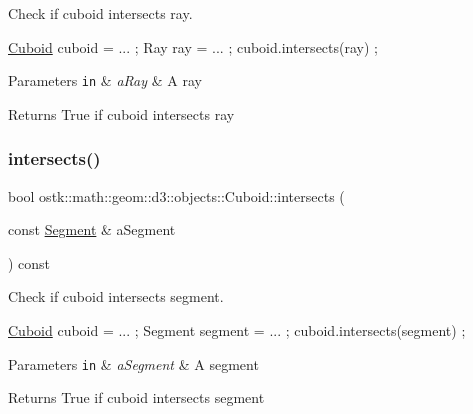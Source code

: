 Check if cuboid intersects ray. 


\begin{DoxyCode}
\hyperlink{classostk_1_1math_1_1geom_1_1d3_1_1objects_1_1_cuboid_a1da071d7cbb0a694348628f098f77c5b}{Cuboid} cuboid = ... ;
Ray ray = ... ;
cuboid.intersects(ray) ;
\end{DoxyCode}



\begin{DoxyParams}[1]{Parameters}
\mbox{\tt in}  & {\em a\+Ray} & A ray \\
\hline
\end{DoxyParams}
\begin{DoxyReturn}{Returns}
True if cuboid intersects ray 
\end{DoxyReturn}
\mbox{\label{classostk_1_1math_1_1geom_1_1d3_1_1objects_1_1_cuboid_a7651ffba557857db7169304e0b07793c}} 
\subsubsection{\texorpdfstring{intersects()}{intersects()}\hspace{0.1cm}{\footnotesize\ttfamily [5/9]}}
{\footnotesize\ttfamily bool ostk\+::math\+::geom\+::d3\+::objects\+::\+Cuboid\+::intersects (\begin{DoxyParamCaption}\item[{const \hyperlink{classostk_1_1math_1_1geom_1_1d3_1_1objects_1_1_segment}{Segment} \&}]{a\+Segment }\end{DoxyParamCaption}) const}



Check if cuboid intersects segment. 


\begin{DoxyCode}
\hyperlink{classostk_1_1math_1_1geom_1_1d3_1_1objects_1_1_cuboid_a1da071d7cbb0a694348628f098f77c5b}{Cuboid} cuboid = ... ;
Segment segment = ... ;
cuboid.intersects(segment) ;
\end{DoxyCode}



\begin{DoxyParams}[1]{Parameters}
\mbox{\tt in}  & {\em a\+Segment} & A segment \\
\hline
\end{DoxyParams}
\begin{DoxyReturn}{Returns}
True if cuboid intersects segment 
\end{DoxyReturn}
\mbox{\label{classostk_1_1math_1_1geom_1_1d3_1_1objects_1_1_cuboid_ad55e530dcadee6dfa1621ad261874a89}} 
